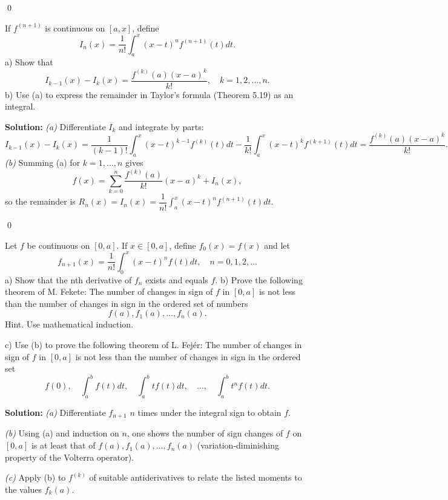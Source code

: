\qed
\begin{problembox}
If $f^{(n+1)}$ is continuous on $[a, x]$, define 
\[I_n(x) = \frac{1}{n!} \int_a^x (x - t)^n f^{(n+1)}(t) dt.\]
a) Show that 
\[I_{k-1}(x) - I_k(x) = \frac{f^{(k)}(a)(x - a)^k}{k!}, \quad k = 1, 2, \ldots, n.\]
b) Use (a) to express the remainder in Taylor's formula (Theorem 5.19) as an integral.
\end{problembox}

\noindent\textbf{Solution:}
\textit{(a)} Differentiate $I_k$ and integrate by parts:
\[I_{k-1}(x)-I_k(x)=\frac{1}{(k-1)!}\int_a^x (x-t)^{k-1} f^{(k)}(t)dt-\frac{1}{k!}\int_a^x (x-t)^k f^{(k+1)}(t)dt=\frac{f^{(k)}(a)(x-a)^k}{k!}.
\]
\textit{(b)} Summing (a) for $k=1,\dots,n$ gives
\[f(x)=\sum_{k=0}^n \frac{f^{(k)}(a)}{k!}(x-a)^k+I_n(x),\]
so the remainder is $R_n(x)=I_n(x)=\dfrac{1}{n!}\int_a^x (x-t)^n f^{(n+1)}(t)dt$.




\qed
\begin{problembox}
Let $f$ be continuous on $[0, a]$. If $x \in [0, a]$, define $f_0(x) = f(x)$ and let 
\[f_{n+1}(x) = \frac{1}{n!} \int_0^x (x - t)^n f(t) dt, \quad n = 0, 1, 2, \ldots\]
a) Show that the nth derivative of $f_n$ exists and equals $f$.
b) Prove the following theorem of M. Fekete: The number of changes in sign of $f$ in $[0, a]$ is not less than the number of changes in sign in the ordered set of numbers 
\[f(a), f_1(a), \ldots, f_n(a).\]
Hint. Use mathematical induction.

c) Use (b) to prove the following theorem of L. Fejér: The number of changes in sign of $f$ in $[0, a]$ is not less than the number of changes in sign in the ordered set
\[f(0), \quad \int_{a}^{b} f(t) dt, \quad \int_{a}^{b} t f(t) dt, \quad \ldots, \quad \int_{a}^{b} t^{n} f(t) dt.\]
\end{problembox}

\noindent\textbf{Solution:}
\textit{(a)} Differentiate $f_{n+1}$ $n$ times under the integral sign to obtain $f$. 

\textit{(b)} Using (a) and induction on $n$, one shows the number of sign changes of $f$ on $[0,a]$ is at least that of $f(a),f_1(a),\dots,f_n(a)$ (variation-diminishing property of the Volterra operator).

\textit{(c)} Apply (b) to $f^{(k)}$ of suitable antiderivatives to relate the listed moments to the values $f_k(a)$.




